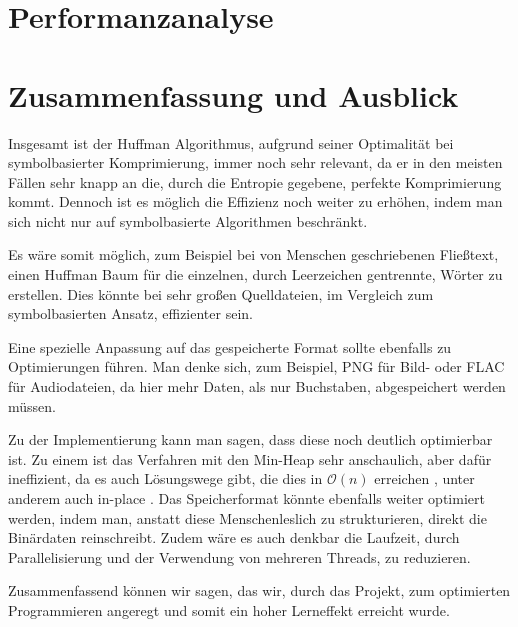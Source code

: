\documentclass[course=erap]{aspdoc}
\begin{document}
\section{Performanzanalyse}


\section{Zusammenfassung und Ausblick}

Insgesamt ist der Huffman Algorithmus, aufgrund seiner Optimalität bei symbolbasierter Komprimierung, immer noch sehr relevant, da er in den meisten Fällen sehr knapp an die, durch die Entropie gegebene, perfekte Komprimierung kommt.
Dennoch ist es möglich die Effizienz noch weiter zu erhöhen, indem man sich nicht nur auf symbolbasierte Algorithmen beschränkt. 

Es wäre somit möglich, zum Beispiel bei von Menschen geschriebenen Fließtext, einen Huffman Baum für die einzelnen, durch Leerzeichen gentrennte, Wörter zu erstellen. Dies könnte bei sehr großen Quelldateien, im Vergleich zum symbolbasierten Ansatz, effizienter sein.

Eine spezielle Anpassung auf das gespeicherte Format sollte ebenfalls zu Optimierungen führen. Man denke sich, zum Beispiel, PNG für Bild- oder FLAC für Audiodateien, da hier mehr Daten, als nur Buchstaben, abgespeichert werden müssen.

Zu der Implementierung kann man sagen, dass diese noch deutlich optimierbar ist. Zu einem ist das Verfahren mit den Min-Heap sehr anschaulich, aber dafür ineffizient, da es auch Lösungswege gibt, die dies in $\mathcal{O}(n)$ erreichen \cite{Leeuwen1976OnTC}, unter anderem auch in-place \cite{10.1007/3-540-60220-8_79}.
Das Speicherformat könnte ebenfalls weiter optimiert werden, indem man, anstatt diese Menschenleslich zu strukturieren, direkt die Binärdaten reinschreibt. Zudem wäre es auch denkbar die Laufzeit, durch Parallelisierung und der Verwendung von mehreren Threads, zu reduzieren.

Zusammenfassend können wir sagen, das wir, durch das Projekt, zum optimierten Programmieren angeregt und somit ein hoher Lerneffekt erreicht wurde.


{}
\end{document}
